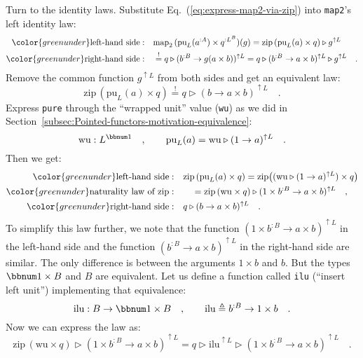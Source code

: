 Turn to the identity laws. Substitute Eq.~(\ref{eq:express-map2-via-zip})
into \lstinline!map2!\textsf{'}s left identity law:
\begin{align*}
{\color{greenunder}\text{left-hand side}:}\quad & \text{map}_{2}\,(\text{pu}_{L}(a^{:A})\times q^{:L^{B}})(g)=\text{zip}\,(\text{pu}_{L}(a)\times q)\triangleright g^{\uparrow L}\\
{\color{greenunder}\text{right-hand side}:}\quad & \overset{!}{=}q\triangleright(b^{:B}\rightarrow g(a\times b))^{\uparrow L}=q\triangleright(b^{:B}\rightarrow a\times b)^{\uparrow L}\triangleright g^{\uparrow L}\quad.
\end{align*}
Remove the common function $g^{\uparrow L}$ from both sides and get
an equivalent law:
\[
\text{zip}\,(\text{pu}_{L}(a)\times q)\overset{!}{=}q\triangleright(b\rightarrow a\times b)^{\uparrow L}\quad.
\]
Express \lstinline!pure! through the \textsf{``}wrapped unit\textsf{''} value
(\lstinline!wu!) as we did in Section~\ref{subsec:Pointed-functors-motivation-equivalence}:
\[
\text{wu}:L^{\bbnum 1}\quad,\quad\quad\text{pu}_{L}(a)=\text{wu}\triangleright(1\rightarrow a)^{\uparrow L}\quad.
\]
Then we get:
\begin{align*}
{\color{greenunder}\text{left-hand side}:}\quad & \text{zip}\,(\text{pu}_{L}(a)\times q)=\text{zip}\big((\text{wu}\triangleright(1\rightarrow a)^{\uparrow L})\times q\big)\\
{\color{greenunder}\text{naturality law of }\text{zip}:}\quad & \quad=\text{zip}\,(\text{wu}\times q)\triangleright(1\times b^{:B}\rightarrow a\times b)^{\uparrow L}\quad,\\
{\color{greenunder}\text{right-hand side}:}\quad & q\triangleright(b\rightarrow a\times b)^{\uparrow L}\quad.
\end{align*}
To simplify this law further, we note that the function $(1\times b^{:B}\rightarrow a\times b)^{\uparrow L}$
in the left-hand side and the function $(b^{:B}\rightarrow a\times b)^{\uparrow L}$
in the right-hand side are similar. The only difference is between
the arguments $1\times b$ and $b$. But the types $\bbnum 1\times B$
and $B$ are equivalent. Let us define a function called \lstinline!ilu!
(\textsf{``}insert left unit\textsf{''}) implementing that equivalence:
\[
\text{ilu}:B\rightarrow\bbnum 1\times B\quad,\quad\quad\text{ilu}\triangleq b^{:B}\rightarrow1\times b\quad.
\]
Now we can express the law as:
\begin{equation}
\text{zip}\,(\text{wu}\times q)\triangleright(1\times b^{:B}\rightarrow a\times b)^{\uparrow L}=q\triangleright\text{ilu}^{\uparrow L}\triangleright(1\times b^{:B}\rightarrow a\times b)^{\uparrow L}\quad.\label{eq:left-identity-zip-derivation1}
\end{equation}
